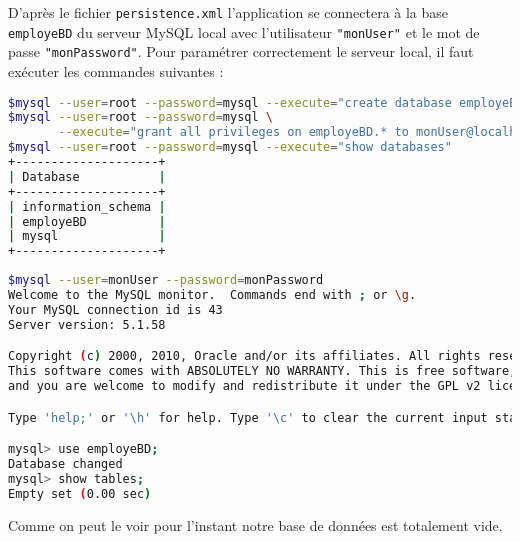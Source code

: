 \documentclass[a4paper,11pt]{article}
\begin{document}
D'après le fichier \texttt{persistence.xml} l'application se connectera à la base \texttt{employeBD} du serveur MySQL 
local avec l'utilisateur \texttt{"monUser"} et le mot de passe \texttt{"monPassword"}. Pour paramétrer correctement le 
serveur local, il faut exécuter les commandes suivantes :
\begin{lstlisting}[language=sh,style=customsh]
$mysql --user=root --password=mysql --execute="create database employeBD"
$mysql --user=root --password=mysql \
       --execute="grant all privileges on employeBD.* to monUser@localhost identified by 'monPassword'"
$mysql --user=root --password=mysql --execute="show databases"
+--------------------+
| Database           |
+--------------------+
| information_schema |
| employeBD          |
| mysql              |
+--------------------+
\end{lstlisting}

\begin{lstlisting}[language=sh,style=customsh]
$mysql --user=monUser --password=monPassword
Welcome to the MySQL monitor.  Commands end with ; or \g.
Your MySQL connection id is 43
Server version: 5.1.58

Copyright (c) 2000, 2010, Oracle and/or its affiliates. All rights reserved.
This software comes with ABSOLUTELY NO WARRANTY. This is free software,
and you are welcome to modify and redistribute it under the GPL v2 license

Type 'help;' or '\h' for help. Type '\c' to clear the current input statement.

mysql> use employeBD;
Database changed
mysql> show tables;
Empty set (0.00 sec)
\end{lstlisting}
Comme on peut le voir pour l'instant notre base de données est totalement vide.
\end{document}
